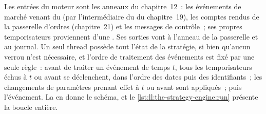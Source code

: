 Les entrées du moteur sont les anneaux du chapitre~12~: les événements de marché venant du  (par l'intermédiaire du 
du chapitre~19), les comptes rendus de la passerelle d'ordres (chapitre~21) et les messages de contrôle~; ses propres temporisateurs proviennent d'une . Ses
sorties vont à l'anneau de la passerelle et au journal. Un seul thread possède tout l'état de la stratégie, si bien qu'aucun verrou n'est nécessaire, et
l'ordre de traitement des événements est fixé par une seule règle~: avant de traiter un événement de temps $t$, tous les temporisateurs échus à
$t$ ou avant se déclenchent, dans l'ordre des dates puis des identifiants~; les changements de paramètres prenant effet à $t$ ou avant sont appliqués~; puis
l'événement. La  en donne le schéma, et le \cref{lst:ll:the-strategy-engine:run} présente la boucle entière.

